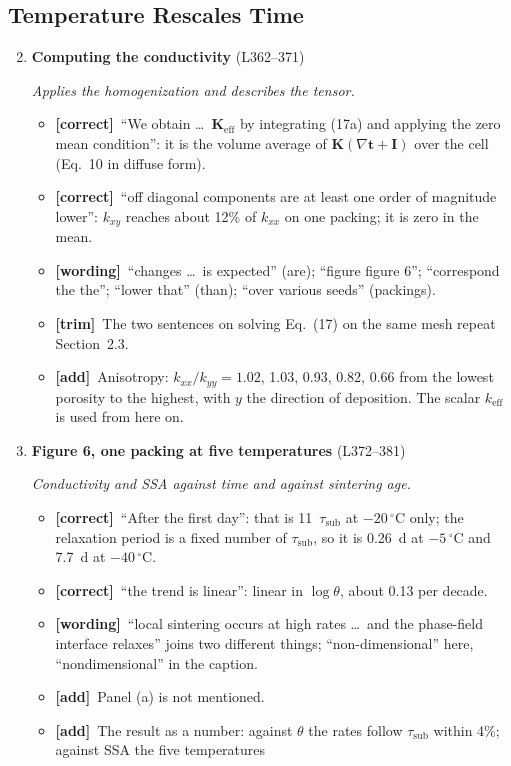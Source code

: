 \documentclass[11pt]{article}
\newcommand{\Pg}[3]{\item \textbf{#1} {\small(#2)}\par\textit{#3}}
\newcommand{\tC}{\textcolor{miss}{\textbf{[correct]}}\ }
\newcommand{\tG}{\textcolor{stale}{\textbf{[wording]}}\ }
\newcommand{\tT}{\textcolor{cut}{\textbf{[trim]}}\ }
\newcommand{\tA}{\textcolor{have}{\textbf{[add]}}\ }
\begin{document}
\subsection{Temperature Rescales Time}
\begin{enumerate}
\setcounter{enumi}{1}
\Pg{Computing the conductivity}{L362--371}{Applies the homogenization and describes the tensor.}
  \begin{itemize}
  \item \tC ``We obtain \ldots\ $\mathbf{K}_{\mathrm{eff}}$ by integrating
    (17a) and applying the zero mean condition'': it is the volume average
    of $\mathbf{K}(\nabla\mathbf{t} + \mathbf{I})$ over the cell (Eq.~10 in
    diffuse form).
  \item \tC ``off diagonal components are at least one order of magnitude
    lower'': $k_{xy}$ reaches about 12\% of $k_{xx}$ on one packing; it is
    zero in the mean.
  \item \tG ``changes \ldots\ is expected'' (are); ``figure figure 6'';
    ``correspond the the''; ``lower that'' (than); ``over various seeds''
    (packings).
  \item \tT The two sentences on solving Eq.~(17) on the same mesh repeat
    Section~2.3.
  \item \tA Anisotropy: $k_{xx}/k_{yy} = 1.02$, 1.03, 0.93, 0.82, 0.66 from
    the lowest porosity to the highest, with $y$ the direction of
    deposition. The scalar $k_{\mathrm{eff}}$ is used from here on.
  \end{itemize}
\Pg{Figure 6, one packing at five temperatures}{L372--381}{Conductivity and SSA against time and against sintering age.}
  \begin{itemize}
  \item \tC ``After the first day'': that is 11~$\tau_{\mathrm{sub}}$ at
    $-20\,^{\circ}$C only; the relaxation period is a fixed number of
    $\tau_{\mathrm{sub}}$, so it is 0.26~d at $-5\,^{\circ}$C and 7.7~d at
    $-40\,^{\circ}$C.
  \item \tC ``the trend is linear'': linear in $\log\theta$, about 0.13 per
    decade.
  \item \tG ``local sintering occurs at high rates \ldots\ and the
    phase-field interface relaxes'' joins two different things;
    ``non-dimensional'' here, ``nondimensional'' in the caption.
  \item \tA Panel (a) is not mentioned.
  \item \tA The result as a number: against $\theta$ the rates follow
    $\tau_{\mathrm{sub}}$ within 4\%; against SSA the five temperatures

\end{itemize}
\end{enumerate}
\end{document}
